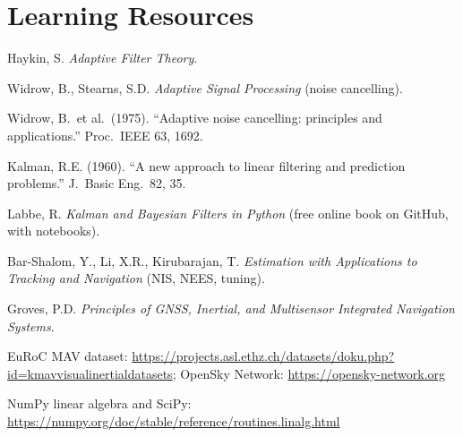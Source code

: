 \documentclass[11pt,a4paper]{article}
\begin{document}
\section*{Learning Resources}
\begin{resources}
  \item Haykin, S. \emph{Adaptive Filter Theory}.
  \item Widrow, B., Stearns, S.D. \emph{Adaptive Signal Processing} (noise cancelling).
  \item Widrow, B.\ et al.\ (1975). ``Adaptive noise cancelling: principles and applications.'' Proc.\ IEEE 63, 1692.
\end{resources}
\begin{resources}
  \item Kalman, R.E. (1960). ``A new approach to linear filtering and prediction problems.'' J.\ Basic Eng.\ 82, 35.
  \item Labbe, R. \emph{Kalman and Bayesian Filters in Python} (free online book on GitHub, with notebooks).
  \item Bar-Shalom, Y., Li, X.R., Kirubarajan, T. \emph{Estimation with Applications to Tracking and Navigation} (NIS, NEES, tuning).
  \item Groves, P.D. \emph{Principles of GNSS, Inertial, and Multisensor Integrated Navigation Systems}.
\end{resources}
\begin{resources}
  \item EuRoC MAV dataset: \url{https://projects.asl.ethz.ch/datasets/doku.php?id=kmavvisualinertialdatasets}; OpenSky Network: \url{https://opensky-network.org}
  \item NumPy linear algebra and SciPy: \url{https://numpy.org/doc/stable/reference/routines.linalg.html}
\end{resources}

\evaluation
\end{document}
